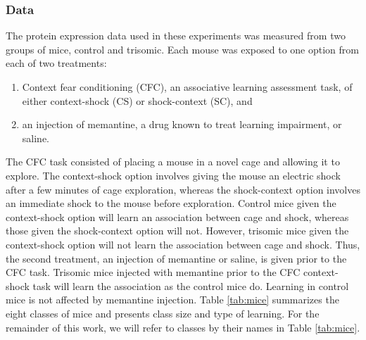 \documentclass[12pt]{article}
\begin{document}
\subsubsection{Data}
The protein expression data used in these experiments was measured from two groups of mice, control and trisomic.  Each mouse was exposed to one option from each of two treatments:
\begin{enumerate}
    \item Context fear conditioning (CFC), an associative learning assessment task, of either context-shock (CS) or shock-context (SC), and
    \item an injection of memantine, a drug known to treat learning impairment, or saline. 
\end{enumerate}
The CFC task consisted of placing a mouse in a novel cage and allowing it to explore. The context-shock option involves giving the mouse an electric shock after a few minutes of cage exploration, whereas the shock-context option involves an immediate shock to the mouse before exploration.  Control mice given the context-shock option will learn an association between cage and shock, whereas those given the shock-context option will not.  However, trisomic mice given the context-shock option will not learn the association between cage and shock. Thus, the second treatment, an injection of memantine or saline, is given prior to the CFC task.  Trisomic mice injected with memantine prior to the CFC context-shock task will learn the association as the control mice do.  Learning in control mice is not affected by memantine injection.  Table \ref{tab:mice} summarizes the eight classes of mice and presents class size and type of learning.  For the remainder of this work, we will refer to classes by their names in Table \ref{tab:mice}.
\end{document}
